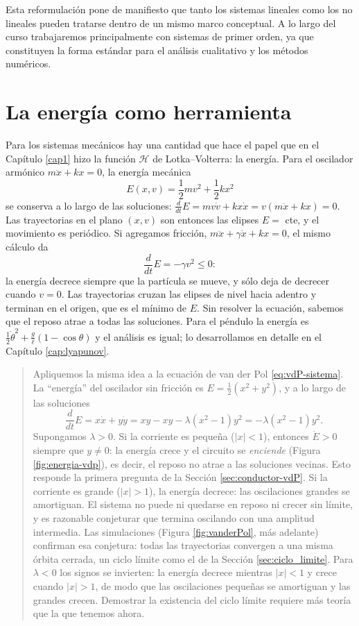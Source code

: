 \documentclass[12pt, a4paper]{amsbook}
\newcommand{\Hc}{{\mathcal H}}
\theoremstyle{remark}
\theoremstyle{definition}
\numberwithin{section}{chapter}
\numberwithin{subsection}{section}
\numberwithin{equation}{section}
\numberwithin{figure}{chapter}
\newenvironment{volvemos}[1]{\medskip\par\noindent\begin{quote}\noindent{\bf Volvemos al problema: #1.}\par\smallskip}{\end{quote}\medskip}
\begin{document}
Esta reformulación pone de manifiesto que tanto los sistemas lineales como los no lineales pueden tratarse dentro de un mismo marco conceptual. A lo largo del curso trabajaremos principalmente con sistemas de primer orden, ya que constituyen la forma estándar para el análisis cualitativo y los métodos numéricos.

\section{La energía como herramienta}\label{sec:energia-herramienta}

Para los sistemas mecánicos hay una cantidad que hace el papel que en el Capítulo \ref{cap1} hizo la función $\Hc$ de Lotka--Volterra: la energía. Para el oscilador armónico $m\ddot x + kx = 0$, la energía mecánica
\[
E(x,v) = \frac12 m v^2 + \frac12 k x^2
\]
se conserva a lo largo de las soluciones: $\frac{d}{dt}E = mv\dot v + kx\dot x = v(m\ddot x + kx) = 0$. Las trayectorias en el plano $(x,v)$ son entonces las elipses $E=$ cte, y el movimiento es periódico. Si agregamos fricción, $m\ddot x + \gamma\dot x + kx=0$, el mismo cálculo da
\[
\frac{d}{dt}E = -\gamma v^2 \le 0 :
\]
la energía decrece siempre que la partícula se mueve, y sólo deja de decrecer cuando $v=0$. Las trayectorias cruzan las elipses de nivel hacia adentro y terminan en el origen, que es el mínimo de $E$. Sin resolver la ecuación, sabemos que el reposo atrae a todas las soluciones. Para el péndulo la energía es $\frac12\dot\theta^2 + \frac{g}{\ell}(1-\cos\theta)$ y el análisis es igual; lo desarrollamos en detalle en el Capítulo \ref{cap:lyapunov}.

\begin{volvemos}{el circuito}
Apliquemos la misma idea a la ecuación de van der Pol \eqref{eq:vdP-sistema}. La ``energía'' del oscilador sin fricción es $E = \frac12(x^2+y^2)$, y a lo largo de las soluciones
\[
\frac{d}{dt}E = x\dot x + y\dot y = xy - xy - \lambda(x^2-1)y^2 = -\lambda(x^2-1)y^2 .
\]
Supongamos $\lambda>0$. Si la corriente es pequeña ($|x|<1$), entonces $\dot E>0$ siempre que $y\neq 0$: la energía crece y el circuito se \emph{enciende} (Figura \ref{fig:energia-vdp}), es decir, el reposo no atrae a las soluciones vecinas. Esto responde la primera pregunta de la Sección \ref{sec:conductor-vdP}. Si la corriente es grande ($|x|>1$), la energía decrece: las oscilaciones grandes se amortiguan. El sistema no puede ni quedarse en reposo ni crecer sin límite, y es razonable conjeturar que termina oscilando con una amplitud intermedia. Las simulaciones (Figura \ref{fig:vanderPol}, más adelante) confirman esa conjetura: todas las trayectorias convergen a una misma órbita cerrada, un ciclo límite como el de la Sección \ref{sec:ciclo_limite}. Para $\lambda<0$ los signos se invierten: la energía decrece mientras $|x|<1$ y crece cuando $|x|>1$, de modo que las oscilaciones pequeñas se amortiguan y las grandes crecen. Demostrar la existencia del ciclo límite requiere más teoría que la que tenemos ahora.
\end{volvemos}
\end{document}
